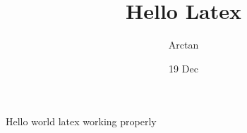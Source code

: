 \documentclass{article}
\title{Hello Latex}
\author{Arctan}
\date{19 Dec}
\begin{document}
    Hello world  latex working properly
\end{document}
